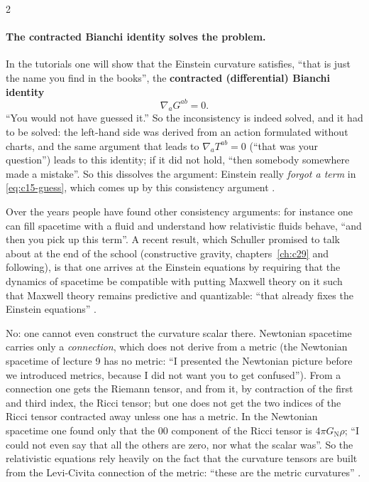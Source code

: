 \begin{paracol}{2}
\paragraph{The contracted Bianchi identity solves the problem.} In the tutorials one will show that the Einstein curvature satisfies, ``that is just the name you find in the books'', the \textbf{contracted (differential) Bianchi identity}
\[
  \nabla_aG^{ab}=0.
\]
``You would not have guessed it.'' So the inconsistency is indeed solved, and it had to be solved: the left-hand side was derived from an action formulated without charts, and the same argument that leads to $\nabla_aT^{ab}=0$ (``that was your question'') leads to this identity; if it did not hold, ``then somebody somewhere made a mistake''. So this dissolves the argument: Einstein really \emph{forgot a term} in \eqref{eq:c15-guess}, which comes up by this consistency argument .
\begin{coursenote}
Over the years people have found other consistency arguments: for instance one can fill spacetime with a fluid and understand how relativistic fluids behave, ``and then you pick up this term''. A recent result, which Schuller promised to talk about at the end of the school (constructive gravity, chapters~\ref{ch:c29} and following), is that one arrives at the Einstein equations by requiring that the dynamics of spacetime be compatible with putting Maxwell theory on it such that Maxwell theory remains predictive and quantizable: ``that already fixes the Einstein equations'' .
\end{coursenote}
\begin{coursenote}
No: one cannot even construct the curvature scalar there. Newtonian spacetime carries only a \emph{connection}, which does not derive from a metric (the Newtonian spacetime of lecture 9 has no metric: ``I presented the Newtonian picture before we introduced metrics, because I did not want you to get confused''). From a connection one gets the Riemann tensor, and from it, by contraction of the first and third index, the Ricci tensor; but one does not get the two indices of the Ricci tensor contracted away unless one has a metric. In the Newtonian spacetime one found only that the $00$ component of the Ricci tensor is $4\pi G_{\mathrm N}\rho$; ``I could not even say that all the others are zero, nor what the scalar was''. So the relativistic equations rely heavily on the fact that the curvature tensors are built from the Levi-Civita connection of the metric: ``these are the metric curvatures'' .
\end{coursenote}


\end{paracol}
